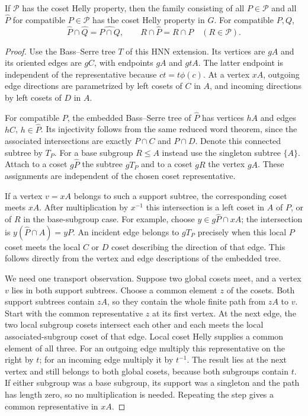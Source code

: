 \begin{theorem}\label{thm:helly}
If $\mathcal P$ has the coset Helly property, then the family consisting
of all $P\in\mathcal P$ and all $\widehat P$ for compatible
$P\in\mathcal P$ has the coset Helly property in $G$.
For compatible $P,Q$,
\[
 \widehat P\cap\widehat Q=\widehat{P\cap Q},\qquad
 R\cap\widehat P=R\cap P\quad(R\in\mathcal P).
\]
\end{theorem}
\begin{proof}
Use the Bass--Serre tree $T$ of this HNN extension. Its vertices are
$gA$ and its oriented edges are $gC$, with endpoints $gA$ and $gtA$.
The latter endpoint is independent of the representative because
$ct=t\phi(c)$. At a vertex $xA$, outgoing edge directions are
parametrized by left cosets of $C$ in $A$, and incoming directions by
left cosets of $D$ in $A$.

For compatible $P$, the embedded Bass--Serre tree of $\widehat P$ has
vertices $hA$ and edges $hC$, $h\in\widehat P$. Its injectivity follows
from the same reduced word theorem, since the associated intersections
are exactly $P\cap C$ and $P\cap D$. Denote this connected subtree by
$T_P$. For a base subgroup $R\leq A$ instead use the singleton subtree
$\{A\}$. Attach to a coset $g\widehat P$ the subtree $gT_P$ and to a
coset $gR$ the vertex $gA$. These assignments are independent of the
chosen coset representative.

If a vertex $v=xA$ belongs to such a support subtree, the corresponding
coset meets $xA$. After multiplication by $x^{-1}$ this intersection is
a left coset in $A$ of $P$, or of $R$ in the base-subgroup case.
For example, choose $y\in g\widehat P\cap xA$; the intersection is
$y(\widehat P\cap A)=yP$. An incident edge belongs to $gT_P$ precisely
when this local $P$ coset meets the local $C$ or $D$ coset describing
the direction of that edge. This follows directly from the vertex and
edge descriptions of the embedded tree.

We need one transport observation. Suppose two global cosets meet, and
a vertex $v$ lies in both support subtrees. Choose a common element $z$
of the cosets. Both support subtrees contain $zA$, so they contain the
whole finite path from $zA$ to $v$. Start with the common representative
$z$ at its first vertex. At the next edge, the two local subgroup cosets
intersect each other and each meets the local associated-subgroup coset
of that edge. Local coset Helly supplies a common element of all three.
For an outgoing edge multiply this representative on the right by $t$;
for an incoming edge multiply it by $t^{-1}$. The result lies at the
next vertex and still belongs to both global cosets, because both
subgroups contain $t$. If either subgroup was a base subgroup, its
support was a singleton and the path has length zero, so no multiplication
is needed. Repeating the step gives a common representative in $xA$.


\end{proof}
